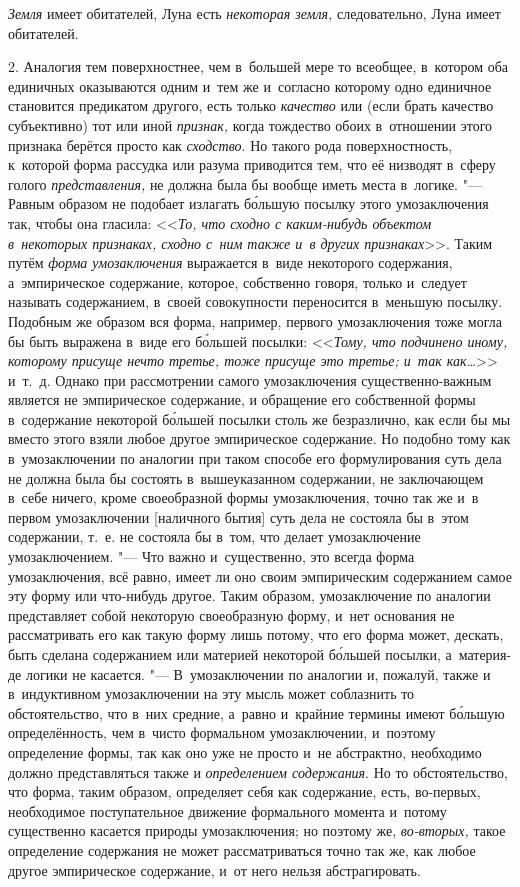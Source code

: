 {\em Земля} имеет обитателей,
Луна есть {\em некоторая земля,}
следовательно, Луна имеет обитателей.

2. Аналогия тем поверхностнее, чем в~большей мере то всеобщее,
в~котором оба единичных оказываются одним и~тем же и~согласно которому одно
единичное становится предикатом другого, есть только
{\em качество} или (если
брать качество субъективно) тот или иной
{\em признак,} когда
тождество обоих в~отношении этого признака берётся просто как
{\em сходство}. Но такого
рода поверхностность, к~которой форма рассудка или разума приводится тем,
что её низводят в~сферу голого
{\em представления,} не
должна была бы вообще иметь места в~логике. "--- Равным
образом не подобает излагать б\'{о}льшую посылку этого умозаключения так, чтобы
она гласила: <<{\em То, что сходно с
каким-нибудь объектом в~некоторых признаках, сходно с~ним также и~в других
признаках}>>. Таким путём
{\em форма умозаключения}
выражается в~виде некоторого содержания, а~эмпирическое
содержание, которое, собственно говоря, только и~следует называть
содержанием, в~своей совокупности переносится в~меньшую посылку. Подобным
же образом вся форма, например, первого умозаключения тоже могла бы быть
выражена в~виде его б\'{о}льшей посылки:
<<{\em Тому, что подчинено иному, которому присуще нечто третье,
тоже присуще это третье; и~так как…}>> и~т.~д. Однако при рассмотрении самого
умозаключения существенно-важным является не эмпирическое содержание, и
обращение его собственной формы в~содержание некоторой б\'{о}льшей посылки
столь же безразлично, как если бы мы вместо этого взяли
любое другое эмпирическое содержание. Но подобно тому как в~умозаключении
по аналогии при таком способе его формулирования суть дела не должна была
бы состоять в~вышеуказанном содержании, не заключающем в~себе ничего, кроме
своеобразной формы умозаключения, точно так же и~в первом умозаключении
[наличного бытия] суть дела не состояла бы в~этом содержании, т.~е. не
состояла бы в~том, что делает умозаключение умозаключением. "---
Что важно и~существенно, это всегда форма умозаключения, всё
равно, имеет ли оно своим эмпирическим содержанием самое эту форму или
что-нибудь другое. Таким образом, умозаключение по аналогии представляет
собой некоторую своеобразную форму, и~нет основания не рассматривать его
как такую форму лишь потому, что его форма может, дескать, быть сделана
содержанием или материей некоторой б\'{о}льшей посылки, а~материя-де логики не
касается. "--- В~умозаключении по аналогии и, пожалуй, также и
в~индуктивном умозаключении на эту мысль может соблазнить то
обстоятельство, что в~них средние, а~равно и~крайние термины имеют б\'{о}льшую
определённость, чем в~чисто формальном умозаключении, и~поэтому определение
формы, так как оно уже не просто и~не абстрактно, необходимо должно
представляться также и {\em определением
содержания}. Но то обстоятельство, что форма, таким образом,
определяет себя как содержание, есть, во-первых, необходимое поступательное
движение формального момента и~потому существенно касается природы
умозаключения; но поэтому же,
{\em во-вторых,} такое
определение содержания не может рассматриваться точно так же, как любое
другое эмпирическое содержание, и~от него нельзя абстрагировать.


